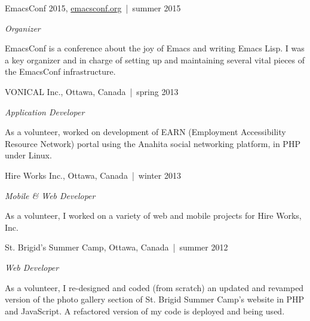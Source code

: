 \documentclass[12pt,letterpaper]{article}
\renewenvironment{itemize}{
  \begin{list}{}{
    \setlength{\leftmargin}{1.5em}
    \setlength{\itemsep}{0.25em}
    \setlength{\parskip}{0pt}
    \setlength{\parsep}{0.25em}
  }
}{
  \end{list}
}
\begin{document}
\begin{itemize}

\item {\large EmacsConf 2015, } \href{http://emacsconf.org}{emacsconf.org}\, |\,
  {\small summer 2015}

  \textit{Organizer}

  \begin{itemize}
  \item EmacsConf is a conference about the joy of Emacs and writing Emacs
    Lisp. I was a key organizer and in charge of setting up and maintaining
    several vital pieces of the EmacsConf infrastructure.
  \end{itemize}
  \vspace{.25em}

\item {\large VONICAL Inc., } Ottawa, Canada\, |\, {\small spring 2013}

  \textit{Application Developer}

  \begin{itemize}
  \item As a volunteer, worked on development of EARN (Employment Accessibility
    Resource Network) portal using the Anahita social networking platform, in
    PHP under Linux.
  \end{itemize}
  \vspace{.25em}

\item {\large Hire Works Inc., } Ottawa, Canada\, |\, {\small winter 2013}

  \textit{Mobile \& Web Developer}

  \begin{itemize}
  \item As a volunteer, I worked on a variety of web and mobile projects for
    Hire Works, Inc.
  \end{itemize}
  \vspace{.25em}

\item {\large St. Brigid's Summer Camp, } Ottawa, Canada\, |\, {\small summer
    2012}

  \textit{Web Developer}

  \begin{itemize}
  \item As a volunteer, I re-designed and coded (from scratch) an updated and
    revamped version of the photo gallery section of St. Brigid Summer Camp's
    website in PHP and JavaScript. A refactored version of my code is deployed
    and being used.
  \end{itemize}

\end{itemize}
\end{document}
